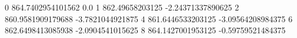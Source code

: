 0 864.7402954101562 0.0
1 862.49658203125 -2.24371337890625
2 860.9581909179688 -3.7821044921875
4 861.6446533203125 -3.09564208984375
6 862.6498413085938 -2.0904541015625
8 864.1427001953125 -0.59759521484375
